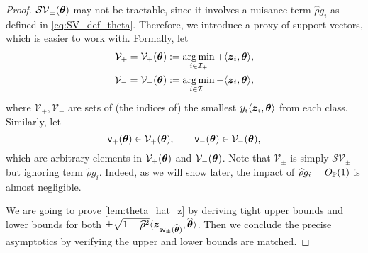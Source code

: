 \begin{proof}
    $\mathcal{SV}_\pm(\vtheta)$ may not be tractable, since it involves a nuisance term $\hat\rho g_i$ as defined in \cref{eq:SV_def_theta}. Therefore, we introduce a proxy of support vectors, which is easier to work with. Formally, let
    \begin{equation}\label{eq:V_def_theta}
        \begin{aligned}
            \mathcal{V}_+ = \mathcal{V}_+(\vtheta) & :=  
        \argmin_{i \in \mathcal{I}_+}    +  \< \zz_i, \vtheta \>  , \\
            \mathcal{V}_- = \mathcal{V}_-(\vtheta) & :=  
        \argmin_{i \in \mathcal{I}_-}    -  \< \zz_i, \vtheta \>  , \\
        \end{aligned}
    \end{equation}
    where $\mathcal{V}_+, \mathcal{V}_-$ are sets of (the indices of) the smallest $y_i \< \zz_{i}, \vtheta \>$ from each class. Similarly, let
    \begin{equation*}
        \mathsf{v}_+(\vtheta) \in  \mathcal{V}_+(\vtheta),
        \qquad
        \mathsf{v}_-(\vtheta) \in  \mathcal{V}_-(\vtheta),
    \end{equation*}
    which are arbitrary elements in $\mathcal{V}_+(\vtheta)$ and $\mathcal{V}_-(\vtheta)$. Note that $\mathcal{V}_\pm$ is simply $\mathcal{SV}_\pm$ but ignoring term $\hat\rho g_i$. Indeed, as we will show later, the impact of $\hat\rho g_i = O_\P(1)$ is almost negligible.

    We are going to prove \cref{lem:theta_hat_z} by deriving tight upper bounds and lower bounds for both $\pm \sqrt{1 - \hat\rho^2} \< \zz_{\mathsf{sv}_\pm(\hat\vtheta)}, \hat\vtheta \>$. Then we conclude the precise asymptotics by verifying the upper and lower bounds are matched.


\end{proof}
